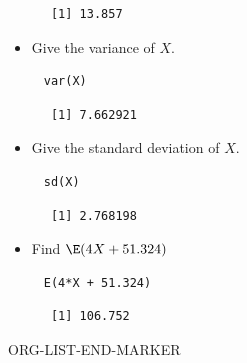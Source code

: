 \documentclass[captions=tableheading]{scrbook}
\begin{document}
\begin{xca}
\begin{verbatim}
      [1] 13.857
\end{verbatim}

\begin{itemize}
\item Give the variance of \(X\).
\end{itemize}

\begin{verbatim}
     var(X)
\end{verbatim}

\begin{verbatim}
      [1] 7.662921
\end{verbatim}

\begin{itemize}
\item Give the standard deviation of \(X\).
\end{itemize}

\begin{verbatim}
     sd(X)
\end{verbatim}

\begin{verbatim}
      [1] 2.768198
\end{verbatim}

\begin{itemize}
\item Find \(\E(4X+51.324)\)
\end{itemize}

\begin{verbatim}
     E(4*X + 51.324)
\end{verbatim}

\begin{verbatim}
      [1] 106.752
\end{verbatim}

ORG-LIST-END-MARKER
\end{xca}
\end{document}
